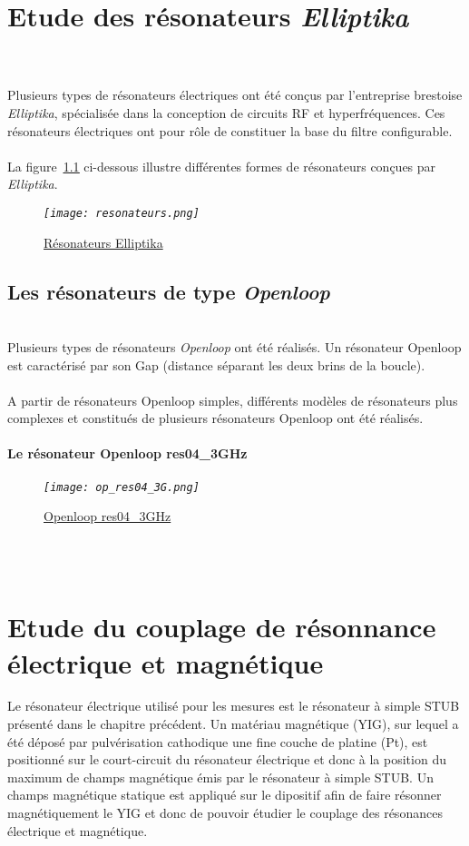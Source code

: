 \documentclass[12pt,fleqn]{book} %
\begin{document}
\setcounter{chapter}{0}
\chapter{Etude des résonateurs \emph{Elliptika}} 
~\\\\\indent Plusieurs types de résonateurs électriques ont été conçus par l'entreprise brestoise \emph{Elliptika}, spécialisée dans la conception de circuits RF et hyperfréquences. Ces résonateurs électriques ont pour rôle de constituer la base du filtre configurable.
~\\\\La figure~\underline{\color{blue}\ref{resonateurs}} ci-dessous illustre différentes formes de résonateurs conçues par \emph{Elliptika}.
\begin{figure}[H]
	\centering
	\itshape
	\texttt{[image: resonateurs.png]}
	\caption{\label{resonateurs} \underline{Résonateurs Elliptika}}
\end{figure}
\section{Les résonateurs de type \emph{Openloop}}
~\\\indent Plusieurs types de résonateurs \emph{Openloop} ont été réalisés. Un résonateur Openloop est caractérisé par son Gap (distance séparant les deux brins de la boucle). 
~\\\\A partir de résonateurs Openloop simples, différents modèles de résonateurs plus complexes et constitués de plusieurs résonateurs Openloop ont été réalisés. 
~\\
\subsubsection{Le résonateur Openloop res04\_3GHz}
\begin{figure}[H]
	\centering
	\itshape
	\texttt{[image: op\_res04\_3G.png]}
	\caption{\label{op_res04_3G} \underline{Openloop res04\_3GHz}}
\end{figure}
\noindent 

~\\\\
\chapter{Etude du couplage de résonnance électrique et magnétique }
Le résonateur électrique utilisé pour les mesures est le résonateur à simple STUB présenté dans le chapitre précédent. Un matériau magnétique (YIG), sur lequel a été déposé par pulvérisation cathodique une fine couche de platine (Pt), est positionné sur le court-circuit du résonateur électrique et donc à la position du maximum de champs magnétique émis par le résonateur à simple STUB. Un champs magnétique statique est appliqué sur le dipositif afin de faire résonner magnétiquement le YIG et donc de pouvoir étudier le couplage des résonances électrique et magnétique.
\end{document}
